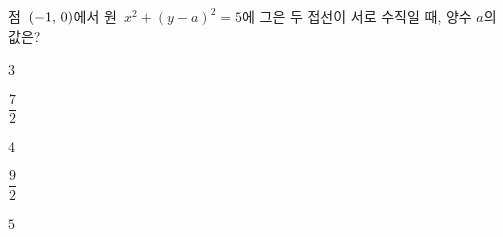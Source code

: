 점~$(-1,\mkern3mu 0)$에서 원~$x^2+(y-a)^2=5$에 그은 두 접선이 서로 수직일 때, 양수 $a$의 값은?
\begin{choices32}{\rule[-3ex]{0pt}{8ex}$3$}{\rule[-3ex]{0pt}{8ex}$\dfrac{7}{2}$}{\rule[-3ex]{0pt}{8ex}$4$}{\rule[-3ex]{0pt}{8ex}$\dfrac{9}{2}$}{\rule[-3ex]{0pt}{8ex}$5$}\end{choices32}
